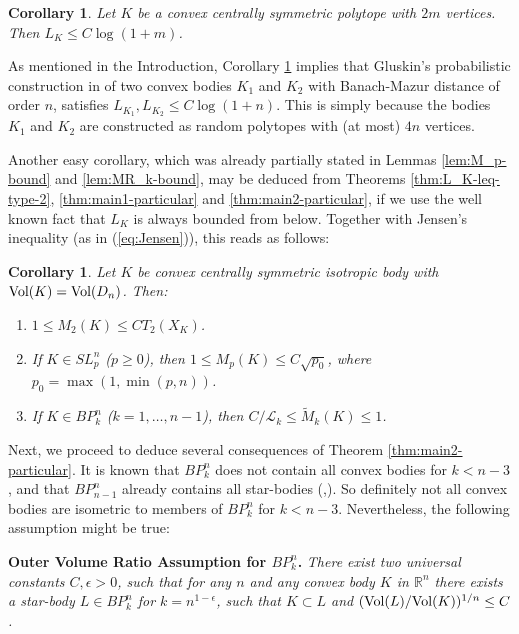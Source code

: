 \documentclass[12pt,oneside]{amsart}
\newtheorem{cor}[thm]{Corollary}
\theoremstyle{definition}
\theoremstyle{remark}
\theoremstyle{proof}
\numberwithin{equation}{section}
\newcommand{\Real}{\mathbb{R}}
\newcommand{\BP}{BP}
\renewcommand{\MR}{\widetilde{M}} %
\newcommand{\Lk}{\mathcal{L}_k}
\newcommand{\Vol}[1]{\textnormal{Vol} (#1)}
\begin{document}
\begin{cor} \label{cor:Junge}
Let $K$ be a convex centrally symmetric polytope with $2m$
vertices. Then $L_K \leq C \log(1+m)$.
\end{cor}

\noindent As mentioned in the Introduction, Corollary
\ref{cor:Junge} implies that Gluskin's probabilistic construction
in \cite{Gluskin-Diameter} of two convex bodies $K_1$ and $K_2$
with Banach-Mazur distance of order $n$, satisfies
$L_{K_1},L_{K_2} \leq C \log(1+n)$. This is simply because the
bodies $K_1$ and $K_2$ are constructed as random polytopes with
(at most) $4n$ vertices.

\medskip


Another easy corollary, which was already partially stated in
Lemmas \ref{lem:M_p-bound} and \ref{lem:MR_k-bound}, may be
deduced from Theorems \ref{thm:L_K-leq-type-2},
\ref{thm:main1-particular} and \ref{thm:main2-particular}, if we
use the well known fact that $L_K$ is always bounded from below.
Together with Jensen's inequality (as in (\ref{eq:Jensen})), this
reads as follows:

\begin{cor} \label{cor:bounds-on-mean-radius}
Let $K$ be convex centrally symmetric isotropic body with
$\Vol{K}=\Vol{D_n}$. Then:
\begin{enumerate}
\item
$1 \leq M_2(K) \leq C T_2(X_K)$.
\item
If $K \in SL_p^n$ ($p\geq 0$), then $1 \leq M_p(K) \leq C
\sqrt{p_0}$, where $p_0 = \max(1,\min(p,n))$.
\item
If $K \in \BP_k^n$ ($k=1,\ldots,n-1$), then $C / \Lk \leq \MR_k(K)
\leq 1$.
\end{enumerate}

\end{cor}

\medskip

Next, we proceed to deduce several consequences of Theorem
\ref{thm:main2-particular}. It is known that $\BP_k^n$ does not
contain all convex bodies for $k<n-3$, and that $\BP_{n-1}^n$
already contains all star-bodies
(\cite{Bourgain-Zhang},\cite{Koldobsky-I-equal-BP}). So definitely
not all convex bodies are isometric to members of $\BP_k^n$ for
$k<n-3$. Nevertheless, the following assumption might be true:

\medskip
\noindent\textbf{Outer Volume Ratio Assumption for $\BP_k^n$.}
\emph{There exist two universal constants $C,\epsilon>0$, such
that for any $n$ and any convex body $K$ in $\Real^n$ there exists
a star-body $L \in \BP_k^n$ for $k = n^{1-\epsilon}$, such that $K
\subset L$ and $(\Vol{L}/\Vol{K})^{1/n} \leq C$.}
\end{document}

